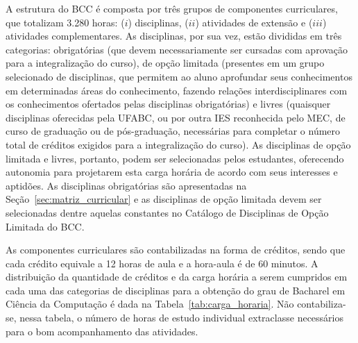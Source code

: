 A estrutura do BCC é composta por três grupos de componentes curriculares, que
totalizam 3.280 horas: ($i$) disciplinas, ($ii$) atividades de extensão e
($iii$) atividades complementares.
As disciplinas, por sua vez, estão divididas em três categorias: obrigatórias
(que devem necessariamente ser cursadas com aprovação para a integralização do
curso), de opção limitada (presentes em um grupo selecionado de disciplinas,
que permitem ao aluno aprofundar seus conhecimentos em determinadas áreas do
conhecimento, fazendo relações interdisciplinares com os conhecimentos
ofertados pelas disciplinas obrigatórias) e livres (quaisquer disciplinas
oferecidas pela UFABC, ou por outra IES reconhecida pelo MEC, de curso de
graduação ou de pós-graduação, necessárias para completar o número total de
créditos exigidos para a integralização do curso).
As disciplinas de opção limitada e livres, portanto, podem ser selecionadas
pelos estudantes, oferecendo autonomia para projetarem esta carga horária de
acordo com seus interesses e aptidões.
As disciplinas obrigatórias são apresentadas na
Seção~\ref{sec:matriz_curricular} e as disciplinas de opção limitada devem ser
selecionadas dentre aquelas constantes no Catálogo de Disciplinas de Opção
Limitada do BCC.

As componentes curriculares são contabilizadas na forma de créditos, sendo que
cada crédito equivale a 12 horas de aula e a hora-aula é de 60 minutos.
A distribuição da quantidade de créditos e da carga horária a serem cumpridos
em cada uma das categorias de disciplinas para a obtenção do grau de Bacharel
em Ciência da Computação é dada na Tabela~\ref{tab:carga_horaria}.
Não contabiliza-se, nessa tabela, o número de horas de estudo individual
extraclasse necessários para o bom acompanhamento das atividades.

